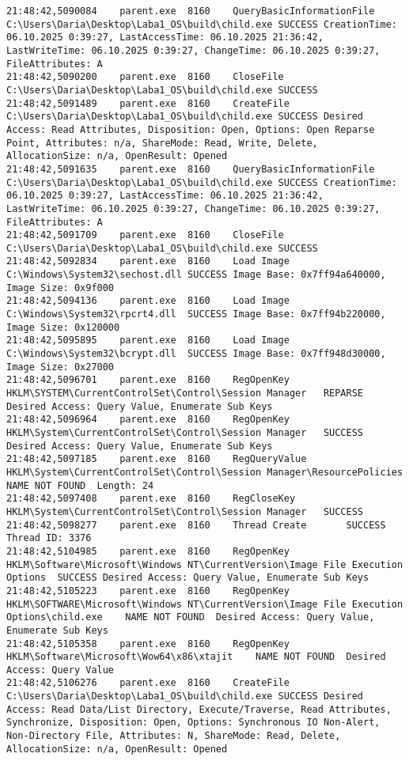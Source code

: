 \begin{verbatim}
21:48:42,5090084	parent.exe	8160	QueryBasicInformationFile	C:\Users\Daria\Desktop\Laba1_OS\build\child.exe	SUCCESS	CreationTime: 06.10.2025 0:39:27, LastAccessTime: 06.10.2025 21:36:42, LastWriteTime: 06.10.2025 0:39:27, ChangeTime: 06.10.2025 0:39:27, FileAttributes: A
21:48:42,5090200	parent.exe	8160	CloseFile	C:\Users\Daria\Desktop\Laba1_OS\build\child.exe	SUCCESS	
21:48:42,5091489	parent.exe	8160	CreateFile	C:\Users\Daria\Desktop\Laba1_OS\build\child.exe	SUCCESS	Desired Access: Read Attributes, Disposition: Open, Options: Open Reparse Point, Attributes: n/a, ShareMode: Read, Write, Delete, AllocationSize: n/a, OpenResult: Opened
21:48:42,5091635	parent.exe	8160	QueryBasicInformationFile	C:\Users\Daria\Desktop\Laba1_OS\build\child.exe	SUCCESS	CreationTime: 06.10.2025 0:39:27, LastAccessTime: 06.10.2025 21:36:42, LastWriteTime: 06.10.2025 0:39:27, ChangeTime: 06.10.2025 0:39:27, FileAttributes: A
21:48:42,5091709	parent.exe	8160	CloseFile	C:\Users\Daria\Desktop\Laba1_OS\build\child.exe	SUCCESS	
21:48:42,5092834	parent.exe	8160	Load Image	C:\Windows\System32\sechost.dll	SUCCESS	Image Base: 0x7ff94a640000, Image Size: 0x9f000
21:48:42,5094136	parent.exe	8160	Load Image	C:\Windows\System32\rpcrt4.dll	SUCCESS	Image Base: 0x7ff94b220000, Image Size: 0x120000
21:48:42,5095895	parent.exe	8160	Load Image	C:\Windows\System32\bcrypt.dll	SUCCESS	Image Base: 0x7ff948d30000, Image Size: 0x27000
21:48:42,5096701	parent.exe	8160	RegOpenKey	HKLM\SYSTEM\CurrentControlSet\Control\Session Manager	REPARSE	Desired Access: Query Value, Enumerate Sub Keys
21:48:42,5096964	parent.exe	8160	RegOpenKey	HKLM\System\CurrentControlSet\Control\Session Manager	SUCCESS	Desired Access: Query Value, Enumerate Sub Keys
21:48:42,5097185	parent.exe	8160	RegQueryValue	HKLM\System\CurrentControlSet\Control\Session Manager\ResourcePolicies	NAME NOT FOUND	Length: 24
21:48:42,5097408	parent.exe	8160	RegCloseKey	HKLM\System\CurrentControlSet\Control\Session Manager	SUCCESS	
21:48:42,5098277	parent.exe	8160	Thread Create		SUCCESS	Thread ID: 3376
21:48:42,5104985	parent.exe	8160	RegOpenKey	HKLM\Software\Microsoft\Windows NT\CurrentVersion\Image File Execution Options	SUCCESS	Desired Access: Query Value, Enumerate Sub Keys
21:48:42,5105223	parent.exe	8160	RegOpenKey	HKLM\SOFTWARE\Microsoft\Windows NT\CurrentVersion\Image File Execution Options\child.exe	NAME NOT FOUND	Desired Access: Query Value, Enumerate Sub Keys
21:48:42,5105358	parent.exe	8160	RegOpenKey	HKLM\Software\Microsoft\Wow64\x86\xtajit	NAME NOT FOUND	Desired Access: Query Value
21:48:42,5106276	parent.exe	8160	CreateFile	C:\Users\Daria\Desktop\Laba1_OS\build\child.exe	SUCCESS	Desired Access: Read Data/List Directory, Execute/Traverse, Read Attributes, Synchronize, Disposition: Open, Options: Synchronous IO Non-Alert, Non-Directory File, Attributes: N, ShareMode: Read, Delete, AllocationSize: n/a, OpenResult: Opened

\end{verbatim}
